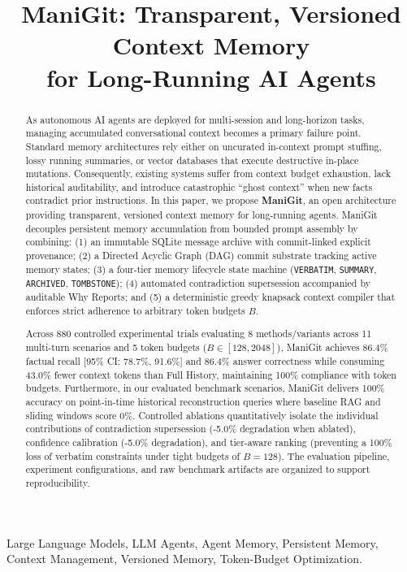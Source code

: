 \documentclass[conference]{IEEEtran}
\title{ManiGit: Transparent, Versioned Context Memory\\for Long-Running AI Agents}
\author{
    \IEEEauthorblockN{Arshmeet Singh}
    \IEEEauthorblockA{\textit{Chandigarh University} \\
    Mohali, Punjab, India}
}
\begin{document}
\maketitle

\begin{abstract}
As autonomous AI agents are deployed for multi-session and long-horizon tasks, managing accumulated conversational context becomes a primary failure point. Standard memory architectures rely either on uncurated in-context prompt stuffing, lossy running summaries, or vector databases that execute destructive in-place mutations. Consequently, existing systems suffer from context budget exhaustion, lack historical auditability, and introduce catastrophic ``ghost context'' when new facts contradict prior instructions. In this paper, we propose \textbf{ManiGit}, an open architecture providing transparent, versioned context memory for long-running agents. ManiGit decouples persistent memory accumulation from bounded prompt assembly by combining: (1) an immutable SQLite message archive with commit-linked explicit provenance; (2) a Directed Acyclic Graph (DAG) commit substrate tracking active memory states; (3) a four-tier memory lifecycle state machine (\texttt{VERBATIM}, \texttt{SUMMARY}, \texttt{ARCHIVED}, \texttt{TOMBSTONE}); (4) automated contradiction supersession accompanied by auditable Why Reports; and (5) a deterministic greedy knapsack context compiler that enforces strict adherence to arbitrary token budgets $B$. 

Across 880 controlled experimental trials evaluating 8 methods/variants across 11 multi-turn scenarios and 5 token budgets ($B \in [128, 2048]$), ManiGit achieves 86.4\% factual recall [95\% CI: 78.7\%, 91.6\%] and 86.4\% answer correctness while consuming 43.0\% fewer context tokens than Full History, maintaining 100\% compliance with token budgets. Furthermore, in our evaluated benchmark scenarios, ManiGit delivers 100\% accuracy on point-in-time historical reconstruction queries where baseline RAG and sliding windows score 0\%. Controlled ablations quantitatively isolate the individual contributions of contradiction supersession (-5.0\% degradation when ablated), confidence calibration (-5.0\% degradation), and tier-aware ranking (preventing a 100\% loss of verbatim constraints under tight budgets of $B=128$). The evaluation pipeline, experiment configurations, and raw benchmark artifacts are organized to support reproducibility.
\end{abstract}

\begin{IEEEkeywords}
Large Language Models, LLM Agents, Agent Memory, Persistent Memory, Context Management, Versioned Memory, Token-Budget Optimization.
\end{IEEEkeywords}
\end{document}

